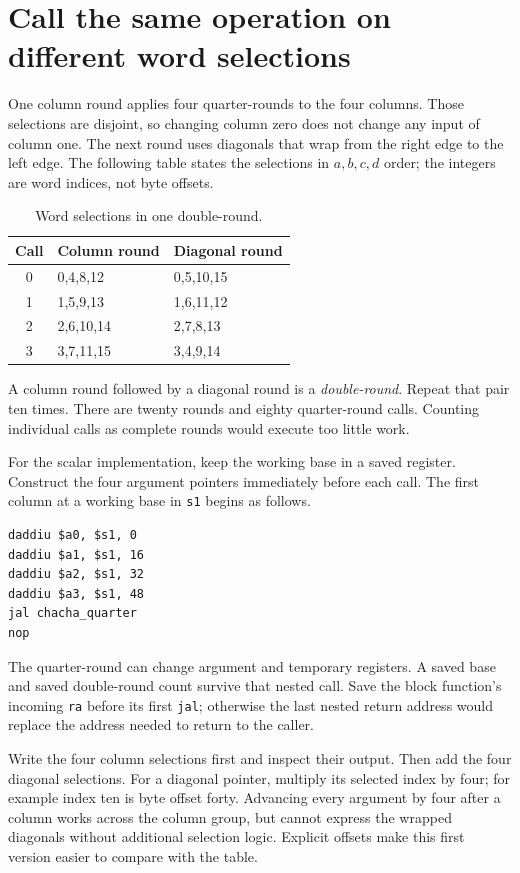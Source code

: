\section{Call the same operation on different word selections}
One column round applies four quarter-rounds to the four columns. Those selections
are disjoint, so changing column zero does not change any input of column one.
The next round uses diagonals that wrap from the right edge to the left edge.
The following table states the selections in \(a,b,c,d\) order; the integers are
word indices, not byte offsets.

\begin{table}[htbp]
\centering\caption{Word selections in one double-round.}
\begin{tabular}{cll}\toprule
Call & Column round & Diagonal round\\\midrule
0 & 0,4,8,12 & 0,5,10,15\\
1 & 1,5,9,13 & 1,6,11,12\\
2 & 2,6,10,14 & 2,7,8,13\\
3 & 3,7,11,15 & 3,4,9,14\\
\bottomrule\end{tabular}
\end{table}

A column round followed by a diagonal round is a \emph{double-round}. Repeat that
pair ten times. There are twenty rounds and eighty quarter-round calls. Counting
individual calls as complete rounds would execute too little work.

For the scalar implementation, keep the working base in a saved register. Construct
the four argument pointers immediately before each call. The first column at a
working base in \texttt{s1} begins as follows.
\begin{verbatim}
daddiu $a0, $s1, 0
daddiu $a1, $s1, 16
daddiu $a2, $s1, 32
daddiu $a3, $s1, 48
jal chacha_quarter
nop
\end{verbatim}

The quarter-round can change argument and temporary registers. A saved base and
saved double-round count survive that nested call. Save the block function's incoming
\texttt{ra} before its first \texttt{jal}; otherwise the last nested return address
would replace the address needed to return to the caller.

Write the four column selections first and inspect their output. Then add the four
diagonal selections. For a diagonal pointer, multiply its selected index by four;
for example index ten is byte offset forty. Advancing every argument by four after
a column works across the column group, but cannot express the wrapped diagonals
without additional selection logic. Explicit offsets make this first version easier
to compare with the table.
